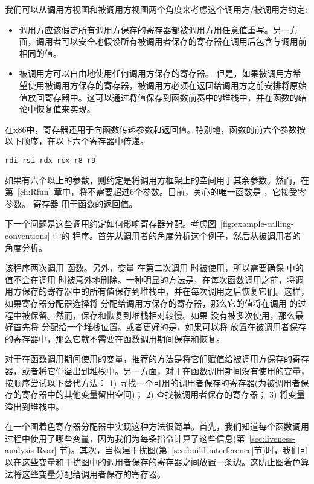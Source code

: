 \documentclass[11pt]{book}
\begin{document}
我们可以从调用方视图和被调用方视图两个角度来考虑这个调用方/被调用方约定:
\begin{itemize}
\item 调用方应该假定所有调用方保存的寄存器都被调用方用任意值重写。另一方面，调用者可以安全地假设所有被调用者保存的寄存器在调用后包含与调用前相同的值。
\item 被调用方可以自由地使用任何调用方保存的寄存器。
  但是，如果被调用方希望使用被调用方保存的寄存器，被调用方必须在返回给调用方之前安排将原始值放回寄存器中。这可以通过将值保存到函数前奏中的堆栈中，并在函数的结论中恢复值来实现。
\end{itemize}

在x86中，寄存器还用于向函数传递参数和返回值。特别地，函数的前六个参数按以下顺序，在以下六个寄存器中传递。
\begin{lstlisting}
rdi rsi rdx rcx r8 r9
\end{lstlisting}
如果有六个以上的参数，则约定是将调用方框架上的空间用于其余参数。然而，在第~\ref{ch:Rfun} 章中，将不需要超过6个参数。目前，关心的唯一函数是  ，它接受零参数。
%
寄存器  用于函数的返回值。

下一个问题是这些调用约定如何影响寄存器分配。考虑图~\ref{fig:example-calling-conventions} 中的 \LangVar{} 程序。首先从调用者的角度分析这个例子，然后从被调用者的角度分析。

该程序两次调用  函数。另外，变量  在第二次调用  时被使用，所以需要确保  中的值不会在调用  时被意外地删除。一种明显的方法是，在每次函数调用之前，将调用方保存的寄存器中的所有值保存到堆栈中，并在每次调用之后恢复它们。这样，如果寄存器分配器选择将 
分配给调用方保存的寄存器，那么它的值将在调用  的过程中被保留。然而，保存和恢复到堆栈相对较慢。如果  没有被多次使用，那么最好首先将  分配给一个堆栈位置。或者更好的是，如果可以将  放置在被调用者保存的寄存器中，那么它就不需要在函数调用期间保存和恢复。

对于在函数调用期间使用的变量，推荐的方法是将它们赋值给被调用方保存的寄存器，或者将它们溢出到堆栈中。另一方面，对于在函数调用期间没有使用的变量，按顺序尝试以下替代方法： 1) 寻找一个可用的调用者保存的寄存器(为被调用者保存的寄存器中的其他变量留出空间)； 2) 查找被调用者保存的寄存器； 3) 将变量溢出到堆栈中。

在一个图着色寄存器分配器中实现这种方法很简单。首先，我们知道每个函数调用过程中使用了哪些变量，因为我们为每条指令计算了这些信息(第~\ref{sec:liveness-analysis-Rvar} 节)。其次，当构建干扰图(第~\ref{sec:build-interference}节)时，我们可以在这些变量和干扰图中的调用者保存的寄存器之间放置一条边。这防止图着色算法将这些变量分配给调用者保存的寄存器。
\end{document}
